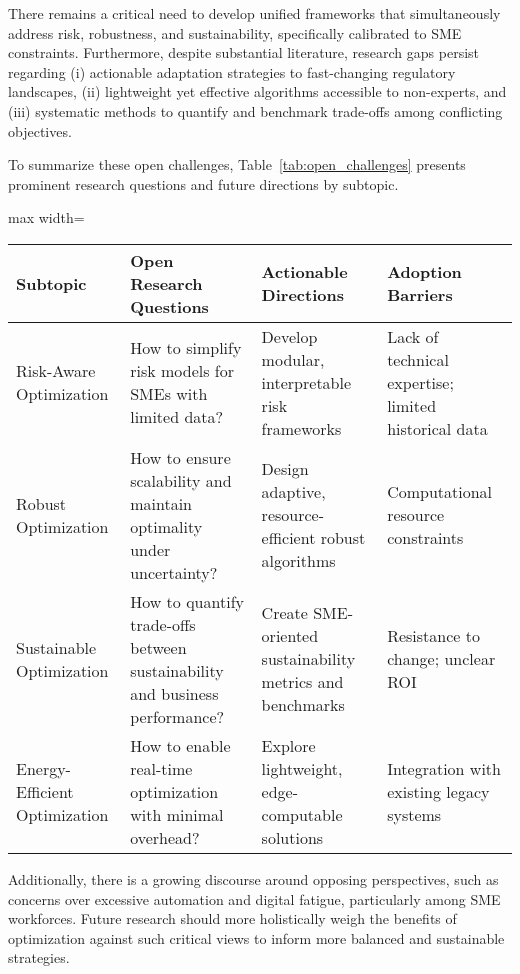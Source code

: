 \documentclass[sigconf]{acmart}
\begin{document}
There remains a critical need to develop unified frameworks that simultaneously address risk, robustness, and sustainability, specifically calibrated to SME constraints. Furthermore, despite substantial literature, research gaps persist regarding (i) actionable adaptation strategies to fast-changing regulatory landscapes, (ii) lightweight yet effective algorithms accessible to non-experts, and (iii) systematic methods to quantify and benchmark trade-offs among conflicting objectives.

To summarize these open challenges, Table~\ref{tab:open_challenges} presents prominent research questions and future directions by subtopic.

\begin{table*}[htbp]
\centering
\caption{Key Open Research Questions in Risk, Robust, Sustainable, and Energy-Efficient Optimization for SME Digital Transformation}
\label{tab:open_challenges}
\begin{adjustbox}{max width=\textwidth}
\begin{tabular}{@{}llll@{}}
\toprule
\textbf{Subtopic} & \textbf{Open Research Questions} & \textbf{Actionable Directions} & \textbf{Adoption Barriers} \\
\midrule
Risk-Aware Optimization & How to simplify risk models for SMEs with limited data? & Develop modular, interpretable risk frameworks & Lack of technical expertise; limited historical data \\
Robust Optimization & How to ensure scalability and maintain optimality under uncertainty? & Design adaptive, resource-efficient robust algorithms & Computational resource constraints \\
Sustainable Optimization & How to quantify trade-offs between sustainability and business performance? & Create SME-oriented sustainability metrics and benchmarks & Resistance to change; unclear ROI \\
Energy-Efficient Optimization & How to enable real-time optimization with minimal overhead? & Explore lightweight, edge-computable solutions & Integration with existing legacy systems \\
\bottomrule
\end{tabular}
\end{adjustbox}
\end{table*}

Additionally, there is a growing discourse around opposing perspectives, such as concerns over excessive automation and digital fatigue, particularly among SME workforces. Future research should more holistically weigh the benefits of optimization against such critical views to inform more balanced and sustainable strategies.
\end{document}
